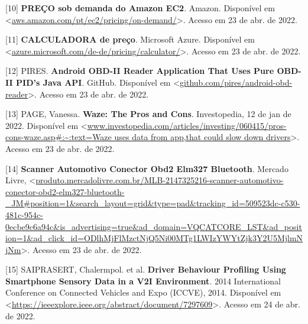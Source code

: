 [10] \textbf{PREÇO sob demanda do Amazon EC2}. Amazon. Disponível em <\url{aws.amazon.com/pt/ec2/pricing/on-demand/}>. Acesso em 23 de abr. de 2022.


[11] \textbf{CALCULADORA de preço}. Microsoft Azure. Disponível em <\url{azure.microsoft.com/de-de/pricing/calculator/}>. Acesso em 23 de abr. de 2022.

[12] PIRES. \textbf{Android OBD-II Reader Application That Uses Pure OBD-II PID's Java API}. GitHub. Disponível em <\url{github.com/pires/android-obd-reader}>. Acesso em 23 de abr. de 2022.

[13] PAGE, Vanessa. \textbf{Waze: The Pros and Cons}. Investopedia, 12 de jan de 2022. Disponível em <\url{www.investopedia.com/articles/investing/060415/pros-cons-waze.asp#:~:text=Waze uses data from app,that could slow down drivers}>. Acesso em 23 de abr. de 2022.


[14] \textbf{Scanner Automotivo Conector Obd2 Elm327 Bluetooth}. Mercado Livre, <\url{produto.mercadolivre.com.br/MLB-2147325216-scanner-automotivo-conector-obd2-elm327-bluetooth-_JM#position=1&search_layout=grid&type=pad&tracking_id=509523dc-c530-481c-954c-0ecbe9c6a94c&is_advertising=true&ad_domain=VQCATCORE_LST&ad_position=1&ad_click_id=ODlhMjFlMzctNjQ5Ni00MTg1LWIzYWYtZjk3Y2U5MjlmNjNm}>. Acesso em 23 de abr. de 2022.

[15] SAIPRASERT, Chalermpol. et al. \textbf{Driver Behaviour Profiling Using Smartphone Sensory Data in a V2I Environment}. 2014 International Conference on Connected Vehicles and Expo (ICCVE), 2014. Disponível em <\url{https://ieeexplore.ieee.org/abstract/document/7297609}>. Acesso em 24 de abr. de 2022.